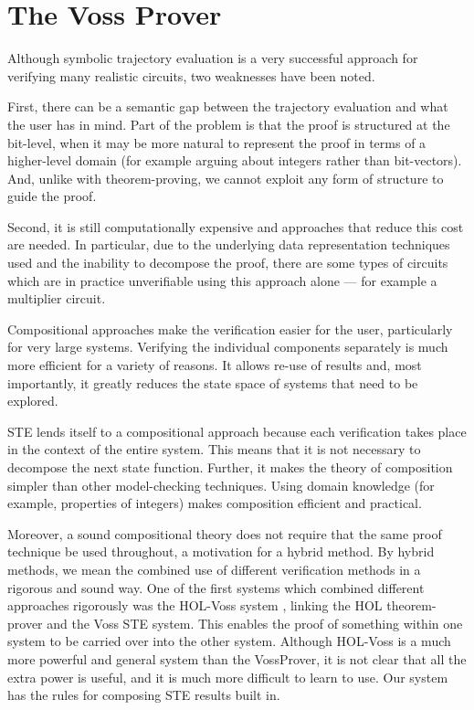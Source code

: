 \section{The Voss Prover}

Although symbolic trajectory evaluation is a very successful
approach for verifying many realistic circuits, two weaknesses have been noted.

First, there can be a semantic gap between the
trajectory evaluation and what the user
has in mind. Part of the problem is that 
the proof is structured at the bit-level, when
it may be more natural to represent the proof in
terms of a higher-level domain (for example arguing
about integers rather than bit-vectors). And, 
unlike with theorem-proving, we cannot exploit
any form of structure to guide the proof.

Second, it is still computationally expensive and
approaches that reduce this cost are needed.
In particular, due to the underlying data representation
techniques used and the inability to decompose the
proof, there are some types of circuits which are in
practice unverifiable using this approach alone ---
for example a multiplier circuit.

Compositional approaches make the verification easier
for the user, particularly for very large systems.
Verifying the individual components separately is
much more efficient for a variety of reasons.  It
allows re-use of results and, most importantly, it
greatly reduces the state space of systems that need
to be explored.

STE lends itself to a compositional approach
because each verification takes place in the
context of the entire system. This means that
it is not necessary to decompose the next state function.
Further, it makes the theory of composition simpler
than other model-checking techniques. Using domain
knowledge (for example, properties of integers)
makes composition efficient and practical.

Moreover, a sound compositional theory does not
require that the same proof technique be used
throughout, a motivation for a hybrid method.
By hybrid methods, we mean the combined use of different
verification methods in a rigorous and sound way.
One of the first systems which combined different approaches
rigorously was the HOL-Voss system
\cite{SegerJoyce92,joyceseger93}, linking the HOL theorem-prover and
the Voss STE system.  This enables the proof of something
within one system to be carried over into the other
system. Although HOL-Voss is a much more powerful and
general system than the VossProver, it is not clear that all
the extra power is useful, and it is much more difficult
to learn to use.  Our system has the rules for
composing STE results built in.

